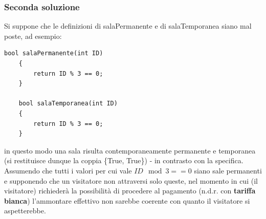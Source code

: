 \documentclass[10pt, italian, openany, landscape]{book}
\begin{document}
\subsubsection{Seconda soluzione}
Si suppone che le definizioni di salaPermanente e di salaTemporanea siano mal poste, ad esempio:
\begin{lstlisting}[style=codeStyle]
    bool salaPermanente(int ID)
    {
        return ID % 3 == 0;
    }

    bool salaTemporanea(int ID)
    {
        return ID % 3 == 0;
    }
\end{lstlisting}
in questo modo una sala risulta contemporaneamente permanente e temporanea (si restituisce dunque la coppia \{True, True\}) 
- in contrasto con la specifica. Assumendo che tutti i valori per cui vale \( ID \mod{3} == 0\) siano sale permanenti
e supponendo che un visitatore non attraversi solo queste, nel momento in cui (il visitatore) richieder\`a la possibilit\`a di
procedere al pagamento (n.d.r. con \textbf{tariffa bianca}) l'ammontare effettivo non sarebbe coerente con quanto
il visitatore si aspetterebbe.
\end{document}
